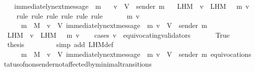 \begin{isabellebody}
\ \ {\isasymlongrightarrow}\ immediately{\isacharunderscore}next{\isacharunderscore}message\ {\isacharparenleft}{\isasymsigma}{\isacharcomma}\ m{\isacharparenright}\isanewline
\ \ {\isasymlongrightarrow}\ v\ {\isasymin}\ V\ {\isacharminus}\ {\isacharbraceleft}sender\ m{\isacharbraceright}\isanewline
\ \ {\isasymlongrightarrow}\ L{\isacharunderscore}H{\isacharunderscore}M\ {\isasymsigma}\ v\ {\isacharequal}\ L{\isacharunderscore}H{\isacharunderscore}M\ {\isacharparenleft}{\isasymsigma}\ {\isasymunion}\ {\isacharbraceleft}m{\isacharbraceright}{\isacharparenright}\ v{\isachardoublequoteclose}\isanewline
%
\isadelimproof
\ \ %
\endisadelimproof
%
\isatagproof
{}\isamarkupfalse%
\ {\isacharparenleft}rule{\isacharcomma}\ rule{\isacharcomma}\ rule{\isacharcomma}\ rule{\isacharcomma}\ rule{\isacharcomma}\ rule{\isacharparenright}\isanewline
{}\isamarkupfalse%
\ {\isacharminus}\isanewline
\ \ \isamarkupfalse%
\ {\isasymsigma}\ m\ v\isanewline
\ \ \isamarkupfalse%
\ {\isachardoublequoteopen}{\isasymsigma}\ {\isasymin}\ {\isasymSigma}\ {\isasymand}\ m\ {\isasymin}\ M\ {\isasymand}\ v\ {\isasymin}\ V{\isachardoublequoteclose}\ {\isachardoublequoteopen}immediately{\isacharunderscore}next{\isacharunderscore}message\ {\isacharparenleft}{\isasymsigma}{\isacharcomma}\ m{\isacharparenright}{\isachardoublequoteclose}\ {\isachardoublequoteopen}v\ {\isasymin}\ V\ {\isacharminus}\ {\isacharbraceleft}sender\ m{\isacharbraceright}{\isachardoublequoteclose}\isanewline
\ \ \isamarkupfalse%
\ {\isachardoublequoteopen}L{\isacharunderscore}H{\isacharunderscore}M\ {\isasymsigma}\ v\ {\isacharequal}\ L{\isacharunderscore}H{\isacharunderscore}M\ {\isacharparenleft}{\isasymsigma}\ {\isasymunion}\ {\isacharbraceleft}m{\isacharbraceright}{\isacharparenright}\ v{\isachardoublequoteclose}\isanewline
\ \ \isamarkupfalse%
\ {\isacharparenleft}cases\ {\isachardoublequoteopen}v\ {\isasymin}\ equivocating{\isacharunderscore}validators\ {\isasymsigma}{\isachardoublequoteclose}{\isacharparenright}\isanewline
\ \ \ \ \isamarkupfalse%
\ True\isanewline
\ \ \ \ \isamarkupfalse%
\ \isamarkupfalse%
\ {\isacharquery}thesis\ \isanewline
\ \ \ \ \ \ \isamarkupfalse%
\ {\isacharparenleft}simp\ add{\isacharcolon}\ L{\isacharunderscore}H{\isacharunderscore}M{\isacharunderscore}def{\isacharparenright}\isanewline
\ \ \ \ \ \ \isamarkupfalse%
\ {\isacartoucheopen}{\isasymsigma}\ {\isasymin}\ {\isasymSigma}\ {\isasymand}\ m\ {\isasymin}\ M\ {\isasymand}\ v\ {\isasymin}\ V{\isacartoucheclose}\ {\isacartoucheopen}immediately{\isacharunderscore}next{\isacharunderscore}message\ {\isacharparenleft}{\isasymsigma}{\isacharcomma}\ m{\isacharparenright}{\isacartoucheclose}\ {\isacartoucheopen}v\ {\isasymin}\ V\ {\isacharminus}\ {\isacharbraceleft}sender\ m{\isacharbraceright}{\isacartoucheclose}\ equivocation{\isacharunderscore}status{\isacharunderscore}of{\isacharunderscore}non{\isacharunderscore}sender{\isacharunderscore}not{\isacharunderscore}affected{\isacharunderscore}by{\isacharunderscore}minimal{\isacharunderscore}transitions\ \isamarkupfalse%

\end{isabellebody}
